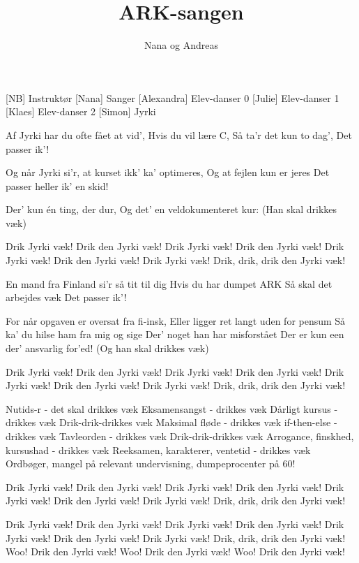 \documentclass[a4paper,11pt]{article}
\title{ARK-sangen}
\author{Nana og Andreas}
\begin{document}
\maketitle

\begin{roles}
  [NB] Instruktør
  [Nana] Sanger
  [Alexandra] Elev-danser 0
  [Julie] Elev-danser 1
  [Klaes] Elev-danser 2
  [Simon] Jyrki
\end{roles}

\begin{song}
  Af Jyrki har du ofte fået at vid',
  Hvis du vil lære C,
  Så ta'r det kun to dag',
  Det passer ik'!

  Og når Jyrki si'r, at kurset ikk' ka' optimeres,
  Og at fejlen kun er jeres
  Det passer heller ik' en skid!

  Der' kun én ting, der dur,
  Og det' en veldokumenteret kur:
  (Han skal drikkes væk)

  Drik Jyrki væk! Drik den Jyrki væk!
  Drik Jyrki væk! Drik den Jyrki væk!
  Drik Jyrki væk! Drik den Jyrki væk!
  Drik Jyrki væk! Drik, drik, drik den Jyrki væk!

  En mand fra Finland si'r så tit til dig
  Hvis du har dumpet ARK
  Så skal det arbejdes væk
  Det passer ik'!

  For når opgaven er oversat fra fi-insk,
  Eller ligger ret langt uden for pensum
  Så ka' du hilse ham fra mig og sige
  Der' noget han har misforstået
  Der er kun een der' ansvarlig for'ed!
  (Og han skal drikkes væk)

  Drik Jyrki væk! Drik den Jyrki væk!
  Drik Jyrki væk! Drik den Jyrki væk!
  Drik Jyrki væk! Drik den Jyrki væk!
  Drik Jyrki væk! Drik, drik, drik den Jyrki væk!

  Nutids-r - det skal drikkes væk
  Eksamensangst - drikkes væk
  Dårligt kursus - drikkes væk
  Drik-drik-drikkes væk
  Maksimal fløde - drikkes væk
  if-then-else - drikkes væk
  Tavleorden - drikkes væk
  Drik-drik-drikkes væk
  Arrogance, finskhed, kursushad - drikkes væk
  Reeksamen, karakterer, ventetid - drikkes væk
  Ordbøger, mangel på relevant undervisning, dumpeprocenter på 60!

  Drik Jyrki væk! Drik den Jyrki væk!
  Drik Jyrki væk! Drik den Jyrki væk!
  Drik Jyrki væk! Drik den Jyrki væk!
  Drik Jyrki væk! Drik, drik, drik den Jyrki væk!

  Drik Jyrki væk! Drik den Jyrki væk!
  Drik Jyrki væk! Drik den Jyrki væk!
  Drik Jyrki væk! Drik den Jyrki væk!
  Drik Jyrki væk! Drik, drik, drik den Jyrki væk!
  Woo! Drik den Jyrki væk!
  Woo! Drik den Jyrki væk!
  Woo! Drik den Jyrki væk!
\end{song}
\end{document}
